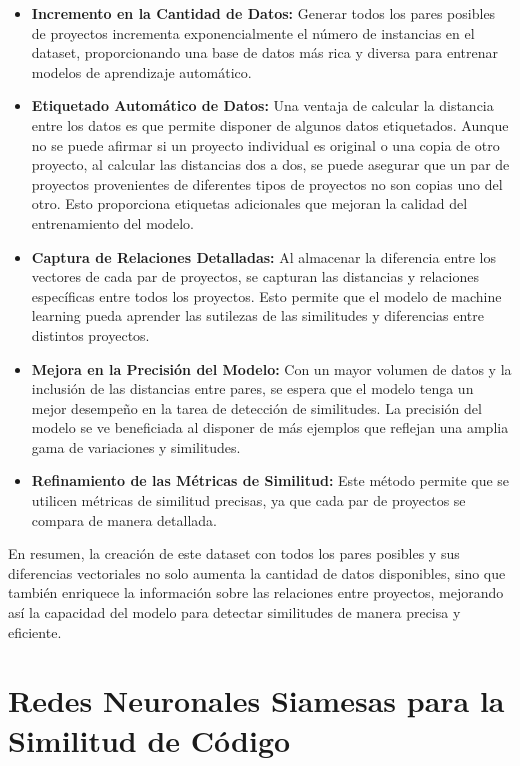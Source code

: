 \begin{itemize}
	\item {\bf Incremento en la Cantidad de Datos:} Generar todos los pares posibles de proyectos incrementa exponencialmente el número de instancias en el dataset, proporcionando una base de datos más rica y diversa para entrenar modelos de aprendizaje automático.
	
	\item {\bf Etiquetado Automático de Datos:} Una ventaja de calcular la distancia entre los datos es que permite disponer de algunos datos etiquetados. Aunque no se puede afirmar si un proyecto individual es original o una copia de otro proyecto, al calcular las distancias dos a dos, se puede asegurar que un par de proyectos provenientes de diferentes tipos de proyectos no son copias uno del otro. Esto proporciona etiquetas adicionales que mejoran la calidad del entrenamiento del modelo.

	\item {\bf Captura de Relaciones Detalladas:} Al almacenar la diferencia entre los vectores de cada par de proyectos, se capturan las distancias y relaciones específicas entre todos los proyectos. Esto permite que el modelo de machine learning pueda aprender las sutilezas de las similitudes y diferencias entre distintos proyectos.
	
	\item {\bf Mejora en la Precisión del Modelo:} Con un mayor volumen de datos y la inclusión de las distancias entre pares, se espera que el modelo tenga un mejor desempeño en la tarea de detección de similitudes. La precisión del modelo se ve beneficiada al disponer de más ejemplos que reflejan una amplia gama de variaciones y similitudes.
	
	\item {\bf Refinamiento de las Métricas de Similitud:} Este método permite que se utilicen métricas de similitud precisas, ya que cada par de proyectos se compara de manera detallada. 

\end{itemize}

En resumen, la creación de este dataset con todos los pares posibles y sus diferencias vectoriales no solo aumenta la cantidad de datos disponibles, sino que también enriquece la información sobre las relaciones entre proyectos, mejorando así la capacidad del modelo para detectar similitudes de manera precisa y eficiente.  


\chapter{Redes Neuronales Siamesas para la Similitud de Código}\label{chapter:proposal}


